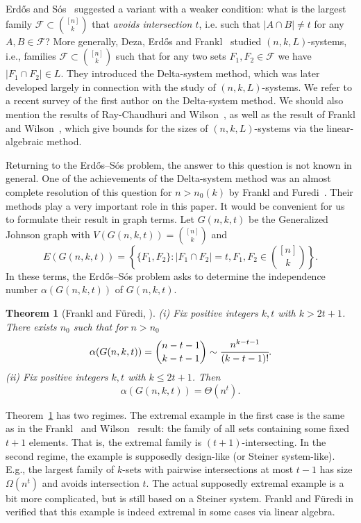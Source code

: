 \documentclass[12pt,a4paper]{article}
\newcommand{\ff}{\mathcal{F}}
\newtheorem{Theorem}{Theorem}
\begin{document}
Erd\H{o}s and S\'os~\cite{ES} suggested a variant with a weaker condition: what is the largest family $\mathcal{F} \subset\binom{[n]}{k}$ that {\it avoids intersection $t$}, i.e. such that $|A \cap B| \neq t$ for any $A, B \in \mathcal{F}$? More generally, Deza, Erd\H os and Frankl~\cite{DEF} studied $(n,k,L)$-systems, i.e., families  $\ff\subset {[n]\choose k}$ such that for any two sets $F_1,F_2\in \ff$ we have $|F_1\cap F_2|\in L.$ They introduced the Delta-system method, which was later developed largely in connection with the study of $(n,k,L)$-systems. We refer to a recent survey of the first author \cite{Kupdel} on the Delta-system method. 
We should also mention the results of Ray-Chaudhuri and Wilson~\cite{RW}, as well as the result of Frankl and Wilson~\cite{FW}, which give bounds for the sizes of $(n,k,L)$-systems via the linear-algebraic method.

Returning to the Erd\H os--S\'os problem, the answer to this question is not known in general. One of the achievements of the Delta-system method was an almost complete resolution of this question for $n>n_0(k)$ by Frankl and Furedi~\cite{FF}. Their methods play a very important role in this paper. It would be convenient for us to formulate their result in graph terms. Let $G(n,k,t)$ be the Generalized Johnson graph with $V(G(n,k,t)) = \binom{[n]}{k}$ and $$E(G(n,k,t)) = \left\{ \{F_1, F_2\}: |F_1 \cap F_2| =t, F_1, F_2 \in \binom{[n]}{k} \right\}.$$
In these terms, the Erd\H os--S\'os problem asks to determine the independence number $\alpha(G(n,k,t))$ of $G(n,k,t).$ 
\begin{Theorem}[Frankl and F\"uredi, \cite{FF}]\label{thmff}
(i) Fix positive integers $k,t$ with $k > 2t+1$. There exists $n_0$ such that for $n > n_0$
$$\alpha(G(n,k,t)) = \binom{n-t-1}{k-t-1} \sim \cfrac{n^{k-t-1}}{(k-t-1)!}.$$
(ii) Fix positive integers $k,t$ with $k \leqslant 2t+1$. Then
$$\alpha(G(n,k,t)) = \Theta (n^t).$$
\end{Theorem}
Theorem~\ref{thmff} has two regimes. The extremal example in the first case is the same as in the Frankl~\cite{F1} and Wilson~\cite{W} result: the family of all sets containing some fixed $t+1$ elements. That is, the extremal family is $(t+1)$-intersecting. In the second regime, the example is supposedly design-like (or Steiner system-like). E.g., the largest family of $k$-sets with pairwise intersections at most $t-1$ has size $\Omega(n^t)$ and avoids intersection $t$. The actual supposedly extremal example is a bit more complicated, but is still based on a Steiner system. Frankl and F\"uredi in \cite{FF} verified that this example is indeed extremal in some cases via linear algebra.   
\end{document}
